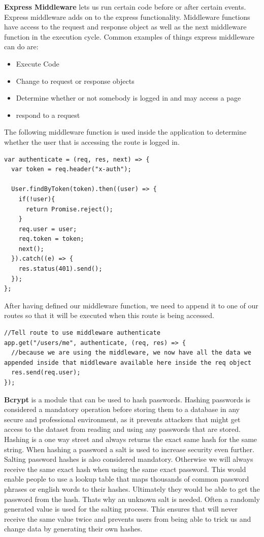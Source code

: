 \textbf{Express Middleware} lets us run certain code before or after certain events. Express middleware adds on to the express functionality. Middleware functions have access to the request and response object as well as the next middleware function in the execution cycle.  Common examples of things express middleware can do are:  

\begin{itemize}
	\item Execute Code
	\item Change to request or response objects
	\item Determine whether or not somebody is logged in and may access a page
	\item respond to a request 
\end{itemize}

The following middleware function is used inside the application to determine whether the user that is accessing the route is logged in.  

\begin{lstlisting}
var authenticate = (req, res, next) => {
  var token = req.header("x-auth");

  User.findByToken(token).then((user) => {
    if(!user){
      return Promise.reject();
    }
    req.user = user;
    req.token = token;
    next(); 
  }).catch((e) => {
    res.status(401).send();
  });
};
\end{lstlisting}  

After having defined our middleware function, we need to append it to one of our routes so that it will be executed when this route is being accessed.   

\begin{lstlisting}
//Tell route to use middleware authenticate
app.get("/users/me", authenticate, (req, res) => {
  //because we are using the middleware, we now have all the data we appended inside that middleware available here inside the req object
  res.send(req.user);
}); 
\end{lstlisting} 

\textbf{Bcrypt} is a module that can be used to hash passwords. Hashing passwords is considered a mandatory operation before storing them to a database in any secure and professional environment, as it prevents attackers that might get access to the dataset from reading and using any passwords that are stored. Hashing is a one way street and always returns the exact same hash for the same string. When hashing a password a salt is used to increase security even further. Salting password hashes is also considered mandatory. Otherwise we will always receive the same exact hash when using the same exact password. This would enable people to use a lookup table that maps thousands of common password phrases or english words to their hashes. Ultimately they would be able to get the password from the hash. Thats why an unknown salt is needed. Often a randomly generated value is used for the salting process. This ensures that will never receive the same value twice and prevents users from being able to trick us and change data by generating their own hashes. 

